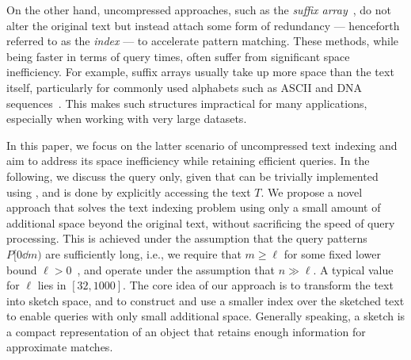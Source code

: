 On the other hand, uncompressed approaches, such as
the \textit{suffix array}~\cite{DBLP:journals/siamcomp/ManberM93}, do not alter the original text but instead attach some form of redundancy --- henceforth referred to as the \textit{index} --- to accelerate pattern matching. These methods, while being faster in terms of query times, often suffer from significant space inefficiency. For example, suffix arrays usually take up more space than the text itself, particularly for commonly used alphabets such as ASCII and DNA sequences~\cite{gusfield1997algorithms}. This makes such structures impractical for many applications, especially when working with very large datasets.

In this paper, we focus on the latter scenario of uncompressed text indexing and
aim to address its space inefficiency while retaining efficient queries. In the
following, we discuss the {\Locate} query only, given that {\Count} can be
trivially implemented using {\Locate}, and {\Extract} is done by explicitly
accessing the text $T$. We propose a novel approach that solves the text
indexing problem using only a small amount of additional space beyond the
original text, without sacrificing the speed of query processing. This is
achieved under the assumption that the query patterns $P[0 \dd m)$ are
  sufficiently long, i.e., we require that $m \geq \ell$ for some fixed lower
  bound $\ell > 0$~\cite{DBLP:conf/latin/AyadLPV24}, and operate under the assumption that $n \gg \ell$. 
A typical value for $\ell$ lies in $[32,1000]$. The core idea of our approach is to transform the text into sketch space, and to
construct and use a smaller index over the sketched text to enable queries with only small additional space.
Generally speaking, a sketch is a compact representation of an object that retains enough information for approximate matches. 

